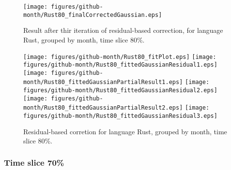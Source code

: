 \begin{figure}[]
\centering
{\texttt{[image: figures/github-month/Rust80\_finalCorrectedGaussian.eps]}}
\caption{Result after thir iteration of residual-based correction, for language Rust, grouped by month, time slice 80\%.}
\end{figure}


\begin{figure}[hb]
\centering
{}
{\texttt{[image: figures/github-month/Rust80\_fitPlot.eps]}}
{\texttt{[image: figures/github-month/Rust80\_fittedGaussianResidual1.eps]}}
{\texttt{[image: figures/github-month/Rust80\_fittedGaussianPartialResult1.eps]}}
{\texttt{[image: figures/github-month/Rust80\_fittedGaussianResidual2.eps]}}
{\texttt{[image: figures/github-month/Rust80\_fittedGaussianPartialResult2.eps]}}
{\texttt{[image: figures/github-month/Rust80\_fittedGaussianResidual3.eps]}}
\caption{Residual-based corretion for language Rust, grouped by month, time slice 80\%.}
\end{figure}


\clearpage 
\newpage 


\FloatBarrier

\subsubsection{Time slice 70\%}

